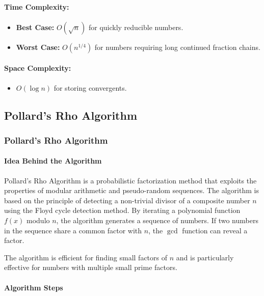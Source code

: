 \documentclass[12pt]{report}
\begin{document}
\paragraph{Time Complexity:}
\begin{itemize}
    \item \textbf{Best Case:} $O(\sqrt{n})$ for quickly reducible numbers.
    \item \textbf{Worst Case:} $O(n^{1/4})$ for numbers requiring long continued fraction chains.
\end{itemize}

\paragraph{Space Complexity:}
\begin{itemize}
    \item $O(\log n)$ for storing convergents.
\end{itemize}
  

\subsection{Pollard's Rho Algorithm}

\subsubsection{Pollard's Rho Algorithm}
\paragraph{Idea Behind the Algorithm}

Pollard's Rho Algorithm is a probabilistic factorization method that exploits the properties of modular arithmetic and pseudo-random sequences. The algorithm is based on the principle of detecting a non-trivial divisor of a composite number $n$ using the Floyd cycle detection method. By iterating a polynomial function $f(x)$ modulo $n$, the algorithm generates a sequence of numbers. If two numbers in the sequence share a common factor with $n$, the $\gcd$ function can reveal a factor.

The algorithm is efficient for finding small factors of $n$ and is particularly effective for numbers with multiple small prime factors.

\paragraph{Algorithm Steps}
\end{document}
